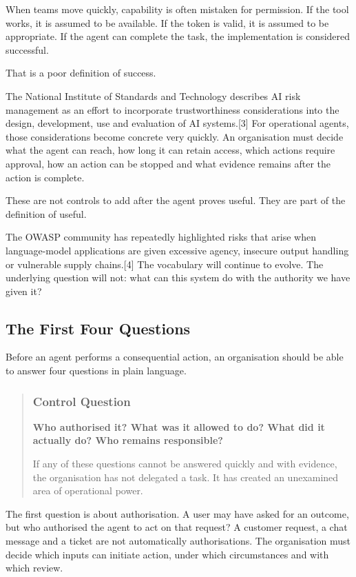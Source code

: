 When teams move quickly, capability is often mistaken for permission. If
the tool works, it is assumed to be available. If the token is valid, it
is assumed to be appropriate. If the agent can complete the task, the
implementation is considered successful.

That is a poor definition of success.

The National Institute of Standards and Technology describes AI risk
management as an effort to incorporate trustworthiness considerations
into the design, development, use and evaluation of AI systems.{[}3{]}
For operational agents, those considerations become concrete very
quickly. An organisation must decide what the agent can reach, how long
it can retain access, which actions require approval, how an action can
be stopped and what evidence remains after the action is complete.

These are not controls to add after the agent proves useful. They are
part of the definition of useful.

The OWASP community has repeatedly highlighted risks that arise when
language-model applications are given excessive agency, insecure output
handling or vulnerable supply chains.{[}4{]} The vocabulary will
continue to evolve. The underlying question will not: what can this
system do with the authority we have given it?

\subsection{The First Four Questions}\label{the-first-four-questions}

Before an agent performs a consequential action, an organisation should
be able to answer four questions in plain language.

\begin{quote}
\subsubsection{Control Question}\label{control-question}

\textbf{Who authorised it? What was it allowed to do? What did it
actually do? Who remains responsible?}

If any of these questions cannot be answered quickly and with evidence,
the organisation has not delegated a task. It has created an unexamined
area of operational power.
\end{quote}

The first question is about authorisation. A user may have asked for an
outcome, but who authorised the agent to act on that request? A customer
request, a chat message and a ticket are not automatically
authorisations. The organisation must decide which inputs can initiate
action, under which circumstances and with which review.

